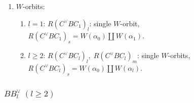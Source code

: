 \documentclass[11pt]{amsart}
\begin{document}
{\begin{enumerate}
\begin{enumerate}
\begin{center}
\end{center}
\end{enumerate}
\item $W$-orbits:
\begin{enumerate}
\item[i)] $l=1$: $R(C^\vee BC_1)_l$: single $W$-orbit, \\
\phantom{$l=1$:\;} $R(C^\vee BC_1)_s=W(\alpha_0) \amalg W(\alpha_1)$.
\item[ii)] $l\geq 2$: $R(C^\vee BC_l)_l, \; R(C^\vee BC_l)_m$: single $W$-orbits, \\
\phantom{$l=1$\, } $R(C^\vee BC_l)_s=W(\alpha_0) \amalg W(\alpha_l)$.
\end{enumerate}
\end{enumerate}

\subsubsection{$BB_l^\vee\; (l\geq 2)$}

}
\end{document}
